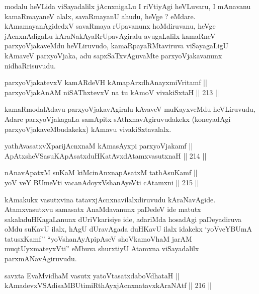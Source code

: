 \begin{artha}
modalu heVLida viSayadalilx jAcnxnigaLu I riVtiyAgi heVLuvaru, I
mAnavanu kamaRmayaneV alalx, savaRmayanU ahudu, heVge ?
eMdare. kAmamayanAgidedxV savaRmaya rUpavanunx hoMdiruvanu, heVge
jAcnxnAdigaLu kAraNakAyaRrUpavAgiralu avugaLalilx kamaRneV
parxyoVjakaveMdu heVLiruvudo, kamaRpayaRMtaviruva viSayagaLigU
kAmaveV parxyoVjaka, adu sapxSaTxvAguvaMte parxyoVjakavanunx
nidhaRrisuvudu.
\end{artha}

\begin{shl}
parxyoVjakatevxV kamARdeVH kAmapArxdhAnayxmiVritamf || \\
parxyoVjakAnAM niSAThxtevxV na tu kAmoV vivakiSxtaH ||  213 ||  
\end{shl}

\begin{artha}
kamaRmodalAdavu parxyoVjakavAgiralu kAvaveV muKayxveMdu heVLiruvudu,
Adare parxyoVjakagaLa samApitx sAthxnavAgiruvudakekx (koneyadAgi
parxyoVjakaveMbudakekx) kAmavu vivakiSxtavalalx.
\end{artha}

\begin{shl}
yathAvasatxvXparijAcnxnaM kAmasAyxpi parxyoVjakamf ||  \\
ApAtxsheVSasuKApAsatxduHKatAvxdAtamxvasutxnaH ||  214 ||  
\end{shl}

\begin{shl}
nAnavApatxM suKaM kiMcinAnxnapAsatxM tathA\s suKamf || \\
yoV veY BUmeVti vacanAdoyxV\s shanAyeVti cA\s \s tamxni ||  215 ||  
\end{shl}


\begin{artha}
kAmakukx vasutxvina tatavxjAcnxnavilalxdiruvudu
kAraNavAgide. Atamxvasutxvu samasatx AnaMdavanunx paDedeV ide matutx
sakaladuHKagaLanunx dUriVkarisiye ide, adariMda hosadAgi paDeyadiruva 
oMdu suKavU ilalx, hAgU dUravAgada duHKavU ilalx idakekx `yoVveYBUmA
tatusxKamf'' ``yoV\s shanAyApipAseV shoVkamoVhaM jarAM
muqtUyxmateyxVti'' eMbuva shurxtiyU Atamxna viSayadalilx
parxmANavAgiruvudu.
\end{artha}

\begin{shl}
savxta EvaMvidhaM vasutx yatoV\s tasatxdaboVdhataH || \\
kAmadevxVSAdisaMBUtimiRthAyxjAcnxnatavxkAraNAtf ||  216 ||  
\end{shl}


